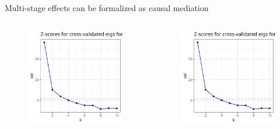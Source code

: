 \documentclass[aspectratio=169]{beamer}
\theoremstyle{remark}
\begin{document}
\begin{frame}{Multi-stage effects can be formalized as causal mediation}
    \begin{columns}
        \centering
        \begin{figure}
            \includegraphics{figures/ecv-Week 4.png}
        \end{figure}
        \centering
        \begin{figure}
            \includegraphics{figures/ecv-Week 4.png}
        \end{figure}
    \end{columns}
\end{frame}
\end{document}
